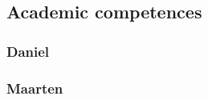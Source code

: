 
\subsection{Academic competences}
\label{assessment:competences}

\subsubsection{Daniel}

\subsubsection{Maarten}
